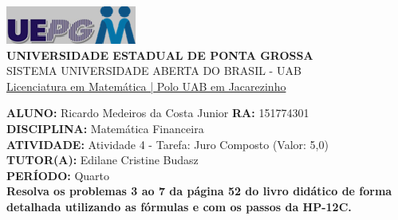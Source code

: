 \documentclass[a4paper, 12pt]{article}
\begin{document}
\begin{flushleft}\includegraphics{logo}\\
\textbf{UNIVERSIDADE ESTADUAL DE PONTA GROSSA} \\
SISTEMA UNIVERSIDADE ABERTA DO BRASIL - UAB \\
\underline{Licenciatura em Matemática | Polo UAB em Jacarezinho}\end{flushleft} 
\textbf{ALUNO:} Ricardo Medeiros da Costa Junior   \textbf{RA:} 151774301 \\
\textbf{DISCIPLINA:} Matemática Financeira \\
\textbf{ATIVIDADE:} Atividade 4 - Tarefa: Juro Composto (Valor: 5,0) \\ 
\textbf{TUTOR(A):} Edilane Cristine Budasz \\
\textbf{PERÍODO:} Quarto \\

\textbf{Resolva os problemas 3 ao 7 da página 52 do livro didático de forma detalhada utilizando as fórmulas e com os passos da HP-12C.}
\end{document}
